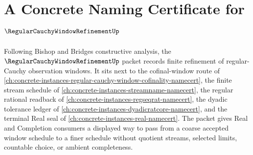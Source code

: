 \chapter{A Concrete Naming Certificate for $\RegularCauchyWindowRefinementUp$}
\label{ch:concrete-instances-regular-cauchy-window-refinement-namecert}

Following Bishop and Bridges constructive analysis, the $\RegularCauchyWindowRefinementUp$ packet records finite refinement of regular-Cauchy observation windows. It sits next to the cofinal-window route of \autoref{ch:concrete-instances-regular-cauchy-window-cofinality-namecert}, the finite stream schedule of \autoref{ch:concrete-instances-streamname-namecert}, the regular rational readback of \autoref{ch:concrete-instances-regseqrat-namecert}, the dyadic tolerance ledger of \autoref{ch:concrete-instances-dyadicratcore-namecert}, and the terminal Real seal of \autoref{ch:concrete-instances-real-namecert}. The packet gives Real and Completion consumers a displayed way to pass from a coarse accepted window schedule to a finer schedule without quotient streams, selected limits, countable choice, or ambient completeness.

